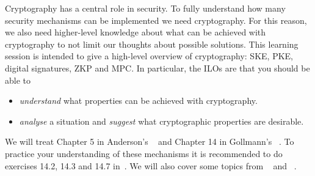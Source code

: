 Cryptography has a central role in security.
To fully understand how many security mechanisms can be implemented we need 
cryptography.
For this reason, we also need higher-level knowledge about what can be achieved 
with cryptography to not limit our thoughts about possible solutions.
This learning session is intended to give a high-level overview of 
cryptography: \ac{SKE}, \ac{PKE}, digital signatures, \ac{ZKP} and \ac{MPC}.
In particular, the \acp{ILO} are that you should be able to
\begin{itemize}
  \item \emph{understand} what properties can be achieved with cryptography.
  \item \emph{analyse} a situation and \emph{suggest} what cryptographic 
    properties are desirable.
\end{itemize}

We will treat
Chapter 5 in Anderson's ~\cite{Anderson2008sea} and
Chapter 14 in Gollmann's ~\cite{Gollmann2011cs}.
To practice your understanding of these mechanisms it is recommended to do 
exercises 14.2, 14.3 and 14.7 in~\cite{Gollmann2011cs}.
We will also cover some topics from 
~\cite{Katz-Lindell} and 
~\cite{GoldreichFOC-1}.
